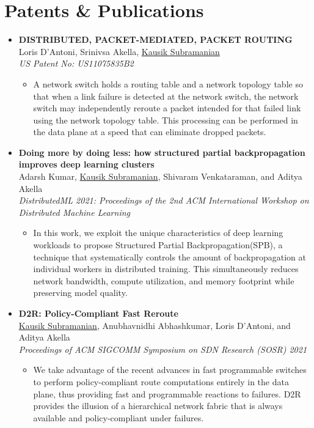 \documentclass[11pt,a4paper,sans]{moderncv}        %
\begin{document}
\section{Patents \& Publications}
\begin{itemize}
	\item \textbf{DISTRIBUTED, PACKET-MEDIATED, PACKET ROUTING} \\
	Loris D’Antoni, Srinivsa Akella, \underline{Kausik Subramanian} \\
	\emph{US Patent No: US11075835B2}
	\begin{itemize}
		\item  A network switch holds a routing table and a network
		topology table so that when a link failure is detected at the
		network switch, the network switch may independently
		reroute a packet intended for that failed link using the
		network topology table. This processing can be performed in
		the data plane at a speed that can eliminate dropped packets.
	\end{itemize}
	\vspace*{4mm}

	\item \textbf{Doing more by doing less: how structured partial backpropagation improves deep learning clusters} \\
	 Adarsh Kumar, \underline{Kausik Subramanian}, Shivaram Venkataraman, and Aditya Akella \\
	\emph{DistributedML 2021: Proceedings of the 2nd ACM International Workshop on Distributed Machine Learning}
	\begin{itemize}
		\item  In this work, we exploit the unique characteristics of deep learning workloads to propose Structured Partial Backpropagation(SPB), a technique that systematically controls the amount of backpropagation at individual workers in distributed training. This simultaneously reduces network bandwidth, compute utilization, and memory footprint while preserving model quality.
	\end{itemize}
	\vspace*{4mm}

	\item \textbf{D2R: Policy-Compliant Fast Reroute} \\
	\underline{Kausik Subramanian}, Anubhavnidhi Abhashkumar, Loris D’Antoni, and Aditya Akella \\
	\emph{Proceedings of ACM SIGCOMM Symposium on SDN Research (SOSR) 2021}
	\begin{itemize}
		\item We take advantage of the recent advances in fast programmable switches 
		to perform policy-compliant route computations entirely in the data plane, 
		thus providing fast and programmable reactions to failures. D2R provides the 
		illusion of a hierarchical network fabric that is always available and 
		policy-compliant under failures. 
	\end{itemize}
	\vspace*{4mm}


\end{itemize}
\end{document}
